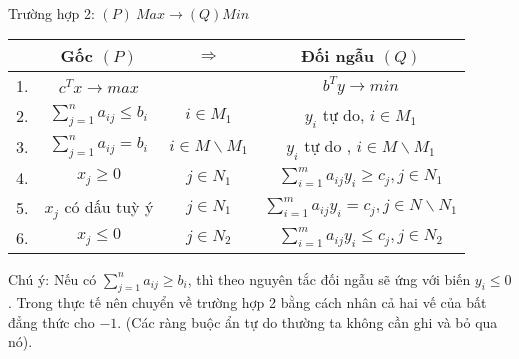\documentclass{article}
\begin{document}
            \vspace{20pt}
            \\            
            Trường hợp 2: $(P) \: Max \rightarrow (Q) Min$ \\
                \begin{center}
                    \begin{tabular}{|c|c|c|c|}
                        \hline
                        & Gốc $(P)$ & $\Rightarrow$ & Đối ngẫu $(Q)$ \\
                        \hline
                        1. & $c^Tx \rightarrow max$ && $b^Ty \rightarrow min$ \\
                        \hline
                        2. &  $\sum_{j=1}^n a_{ij} \leq b_i$ & $i \in M_1$ & $y_i$ tự do, $i \in M_1$ \\
                        \hline
                        3. & $\sum_{j=1}^n a_{ij} = b_i$ & $i \in M \backslash M_1$ & $y_i$ tự do , $i \in M\backslash M_1$ \\
                        \hline
                        4. & $x_j \geq 0$ & $j \in N_1$ & $\sum_{i=1}^m a_{ij}y_i \geq c_j , j \in N_1$ \\
                        \hline
                        5. & $x_j$ có dấu tuỳ ý & $j \in N_1$ & $\sum_{i=1}^m a_{ij} y_i = c_j , j \in N\backslash N_1$ \\
                        \hline
                        6. & $x_j \leq 0$ & $j \in N_2$ & $\sum_{i=1}^m a_{ij}y_i \leq c_j , j \in N_2$ \\
                        \hline
                    \end{tabular}
                \end{center}
            Chú ý: Nếu có $\sum_{j=1}^n a_{ij} \geq b_i$, thì theo nguyên tắc đối ngẫu sẽ ứng với biến $y_i \leq 0$. Trong thực tế nên chuyển về trường hợp 2 bằng cách nhân cả hai vế của bất đẳng thức cho $-1$. (Các ràng buộc ẩn tự do thường ta không cần ghi và bỏ qua nó).
\end{document}
